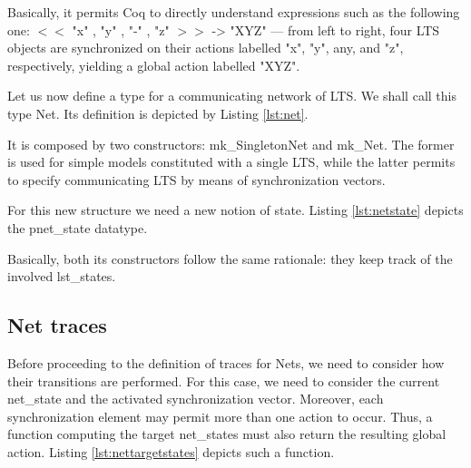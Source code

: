 		
                      	
    \noindent Basically, it permits Coq to directly understand expressions such 
    as the following one: \textsf{$<<$ "x" , "y" , "-" , "z" $>>$ -> "XYZ"} --- from left to right,
    four \textsf{LTS} objects are synchronized on their \textsf{actions} labelled \textsf{"x"}, \textsf{"y"}, any,
    and \textsf{"z"}, respectively, yielding a global \textsf{action} labelled \textsf{"XYZ"}.

	Let us now define a type for a communicating network of \ac{LTS}. We shall call this type \textsf{Net}.
	Its definition is depicted by Listing \ref{lst:net}.	

		

	\noindent It is composed by two constructors: \textsf{mk\_SingletonNet} and \textsf{mk\_Net}.
	The former is used for simple models constituted with a single \ac{LTS}, while the latter
	permits to specify communicating \ac{LTS} by means of synchronization vectors.
	
	For this new structure we need a new notion of state. Listing \ref{lst:netstate} depicts the \textsf{pnet\_state}
	datatype.

		

	\noindent Basically, both its constructors follow the same rationale: they keep track of the 
	involved \textsf{lst\_states}. 
	
	
  \subsection{Net traces}	
\label{sub:net traces}		
	
	Before proceeding to the definition of traces for	\textsf{Net}s, we need to consider
	how their transitions are performed. For this case, we need to consider the current
	\textsf{net\_state} and the activated synchronization vector. Moreover, each synchronization
	element may permit more than one \textsf{action} to occur. Thus, a function
	computing the target \textsf{net\_state}s must also return the resulting global action.
	Listing \ref{lst:nettargetstates} depicts such a function.
		
